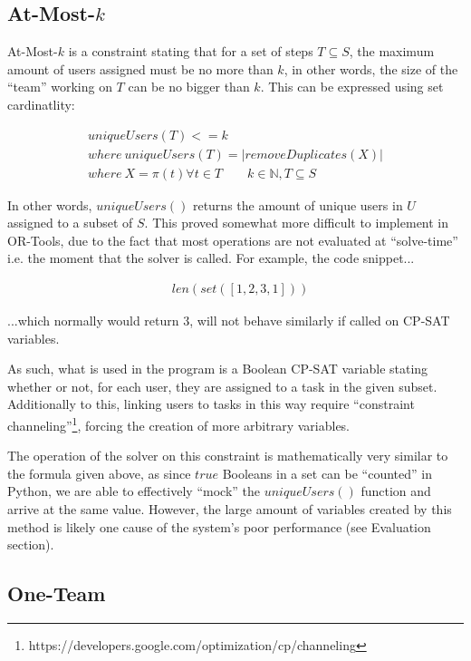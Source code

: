 \documentclass[11pt]{article}
\begin{document}
		\subsection{At-Most-\(k\)}

			At-Most-\(k\) is a constraint stating that for a set of steps \(T \subseteq S\),
			the maximum amount of users assigned must be no more than \(k\),
			in other words, the size of the ``team'' working on \(T\) can be no bigger than \(k\).
			This can be expressed using set cardinatlity:

			\begin{multline}
				uniqueUsers(T) <= k\\
				where \ uniqueUsers(T) = |removeDuplicates(X)|\\
				where \ X = \pi(t)\forall t \in T \qquad k \in \mathbb{N}, T \subseteq S
			\end{multline}
			
			In other words, \(uniqueUsers()\) returns the amount of unique users in \(U\) assigned to a subset of \(S\).
			This proved somewhat more difficult to implement in OR-Tools,
			due to the fact that most operations are not evaluated at ``solve-time''
			i.e. the moment that the solver is called. For example, the code snippet...

			\begin{align*}
				&len(set([1,2,3,1]))
			\end{align*}

			...which normally would return \(3\), will not behave similarly if called on CP-SAT variables.

			As such, what is used in the program is a Boolean CP-SAT variable stating whether or not,
			for each user, they are assigned to a task in the given subset.
			Additionally to this, linking users to tasks in this way require ``constraint channeling''\footnote{https://developers.google.com/optimization/cp/channeling},
			forcing the creation of more arbitrary variables.
			
			The operation of the solver on this constraint is mathematically very similar to the formula given above,
			as since \(true\) Booleans in a set can be ``counted'' in Python,
			we are able to effectively ``mock'' the \(uniqueUsers()\) function and arrive at the same value.
			However, the large amount of variables created by this method is likely one cause of the system's poor performance (see Evaluation section).

		\subsection{One-Team}
\end{document}
